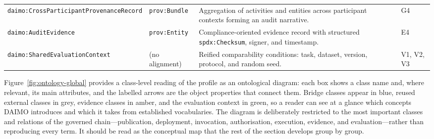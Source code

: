 \documentclass[Afour,sagev,times]{sagej}
\newcommand{\code}[1]{\texttt{#1}}
\begin{document}
\begin{table}[tb]
\begin{tabular}{@{}p{4cm}p{3cm}p{6cm}p{2.2cm}@{}}
\code{daimo:CrossParticipant}\newline\code{ProvenanceRecord} & \code{prov:Bundle} & Aggregation of activities and entities across participant contexts forming an audit narrative. & G4 \\
\code{daimo:AuditEvidence} & \code{prov:Entity} & Compliance-oriented evidence record with structured \code{spdx:Checksum}, signer, and timestamp. & E4 \\
\code{daimo:SharedEvaluation}\newline\code{Context} & (no alignment) & Reified comparability conditions: task, dataset, version, protocol, and random seed. & V1, V2, V3 \\
\bottomrule
\end{tabular}
\end{table}

Figure~\ref{fig:ontology-global} provides a class-level reading of the profile as an ontological diagram: each box shows a class name and, where relevant, its main attributes, and the labelled arrows are the object properties that connect them. Bridge classes appear in blue, reused external classes in grey, evidence classes in amber, and the evaluation context in green, so a reader can see at a glance which concepts DAIMO introduces and which it takes from established vocabularies. The diagram is deliberately restricted to the most important classes and relations of the governed chain---publication, deployment, invocation, authorisation, execution, evidence, and evaluation---rather than reproducing every term. It should be read as the conceptual map that the rest of the section develops group by group.
\end{document}
